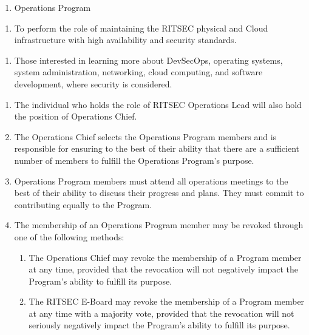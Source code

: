 

\begin{enumerate}
	\item Operations Program
\end{enumerate}


\begin{enumerate}
	\item To perform the role of maintaining the RITSEC physical and Cloud infrastructure
	      with high availability and security standards.
\end{enumerate}


\begin{enumerate}
	\item Those interested in learning more about DevSecOps, operating systems, system
	      administration, networking, cloud computing, and software development, where
	      security is considered.
\end{enumerate}


\begin{enumerate}
	\item The individual who holds the role of RITSEC Operations Lead will also hold the
	      position of Operations Chief.
	\item The Operations Chief selects the Operations Program members and is responsible
	      for ensuring to the best of their ability that there are a sufficient number of
	      members to fulfill the Operations Program's purpose.
	\item Operations Program members must attend all operations meetings to the best of
	      their ability to discuss their progress and plans. They must commit to
	      contributing equally to the Program.
	\item The membership of an Operations Program member may be revoked through one of
	      the following methods:
	      \begin{enumerate}
		      \item The Operations Chief may revoke the membership of a Program member at any time,
		            provided that the revocation will not negatively impact the Program's ability
		            to fulfill its purpose.
		      \item The RITSEC E-Board may revoke the membership of a Program member at any time
		            with a majority vote, provided that the revocation will not seriously
		            negatively impact the Program's ability to fulfill its purpose.
	      \end{enumerate}
\end{enumerate}